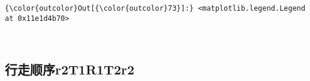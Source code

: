 \documentclass[11pt]{article}
\begin{document}
\begin{Verbatim}[commandchars=\\\{\}]
{\color{outcolor}Out[{\color{outcolor}73}]:} <matplotlib.legend.Legend at 0x11e1d4b70>
\end{Verbatim}
            
    \begin{center}
    \end{center}
    { \hspace*{\fill} \\}
    
    \subsection{行走顺序r2T1R1T2r2}\label{ux884cux8d70ux987aux5e8fr2t1r1t2r2}
\end{document}
